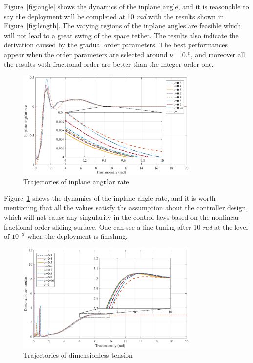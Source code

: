 \documentclass[ShortAfour]{sage}
\theoremstyle{plain}
\theoremstyle{remark}
\begin{document}
  Figure~\ref{fig:angle} shows the dynamics of the inplane angle, and it is reasonable to say the deployment will be completed at 10 {\it rad} with the results shown in Figure~\ref{fig:length}. The varying regions of the inplane angles are feasible which will not lead to a great swing of the space tether. The results also indicate the derivation caused by the gradual order parameters. The best performances appear when the order parameters are selected around $\nu =0.5$, and moreover all the results with fractional order are better than the integer-order one. 
\begin{figure}[hbtp]
  \centering
  \includegraphics[width=0.8\textwidth]{p9_angular_rate.eps}
  \caption{Trajectories of inplane angular rate} 
  \label{fig:angular rate}
  \end{figure}

  Figure~\ref{fig:angular rate} shows the dynamics of the inplane angle rate, and it is worth mentioning that all the values satisfy the assumption about the controller design, which will not cause any singularity in the control laws based on the nonlinear fractional order sliding surface. One can see a fine tuning after 10 {\it rad} at the level of $10^{-3}$ when the deployment is finishing. 
  \begin{figure}[hbtp]
    \centering
    \includegraphics[width=0.8\textwidth]{p9_input.eps} 
    \caption{Trajectories of dimensionless tension}
    \label{fig:input}
    \end{figure}
\end{document}
